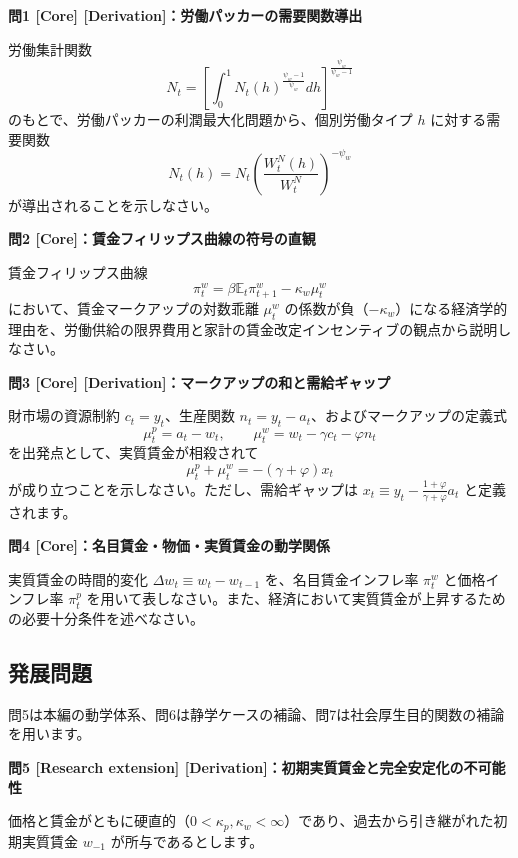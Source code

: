 \documentclass[
  japanese,
  lualatex,
  ja=standard,
  12pt,
  a4paper]{ltjsarticle}
\begin{document}
\textbf{問1 {[}Core{]} {[}Derivation{]}：労働パッカーの需要関数導出}

労働集計関数 \[
N_t
=
\left[
\int_0^1
N_t(h)^{\frac{\psi_w-1}{\psi_w}}dh
\right]^{\frac{\psi_w}{\psi_w-1}}
\] のもとで、労働パッカーの利潤最大化問題から、個別労働タイプ \(h\)
に対する需要関数 \[
N_t(h)
=
N_t
\left(
\frac{W_t^N(h)}{W_t^N}
\right)^{-\psi_w}
\] が導出されることを示しなさい。

\textbf{問2 {[}Core{]}：賃金フィリップス曲線の符号の直観}

賃金フィリップス曲線 \[
\pi^w_t
=
\beta\mathbb{E}_t\pi^w_{t+1}
-
\kappa_w\mu^w_t
\] において、賃金マークアップの対数乖離 \(\mu^w_t\)
の係数が負（\(-\kappa_w\)）になる経済学的理由を、労働供給の限界費用と家計の賃金改定インセンティブの観点から説明しなさい。

\textbf{問3 {[}Core{]} {[}Derivation{]}：マークアップの和と需給ギャップ}

財市場の資源制約 \(c_t=y_t\)、生産関数
\(n_t=y_t-a_t\)、およびマークアップの定義式 \[
\mu^p_t=a_t-w_t,
\qquad
\mu^w_t=w_t-\gamma c_t-\varphi n_t
\] を出発点として、実質賃金が相殺されて \[
\mu^p_t+\mu^w_t=-(\gamma+\varphi)x_t
\] が成り立つことを示しなさい。ただし、需給ギャップは
\(x_t \equiv y_t - \frac{1+\varphi}{\gamma+\varphi}a_t\)
と定義されます。

\textbf{問4 {[}Core{]}：名目賃金・物価・実質賃金の動学関係}

実質賃金の時間的変化 \(\Delta w_t \equiv w_t - w_{t-1}\)
を、名目賃金インフレ率 \(\pi_t^w\) と価格インフレ率 \(\pi_t^p\)
を用いて表しなさい。また、経済において実質賃金が上昇するための必要十分条件を述べなさい。

\subsection{発展問題}\label{sec-lecture10-extensions}

問5は本編の動学体系、問6は静学ケースの補論、問7は社会厚生目的関数の補論を用います。

\textbf{問5 {[}Research extension{]}
{[}Derivation{]}：初期実質賃金と完全安定化の不可能性}

価格と賃金がともに硬直的（\(0<\kappa_p,\kappa_w<\infty\)）であり、過去から引き継がれた初期実質賃金
\(w_{-1}\) が所与であるとします。
\end{document}
